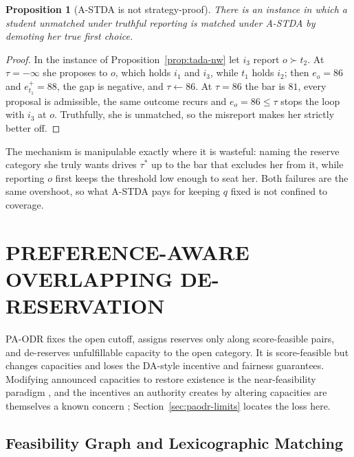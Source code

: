 \documentclass[a4paper,twoside]{article}
\newtheorem{proposition}{Proposition}
\theoremstyle{definition}
\begin{document}
\begin{proposition}[A-STDA is not strategy-proof]
\label{prop:tada-notsp}
There is an instance in which a student unmatched under truthful reporting is matched under A-STDA by demoting her true first choice.
\end{proposition}

\begin{proof}
In the instance of Proposition~\ref{prop:tada-nw} let $i_3$ report $o\succ t_2$. At $\tau=-\infty$ she proposes to $o$, which holds $i_1$ and $i_3$, while $t_1$ holds $i_2$; then $e_o=86$ and $e_{t_1}^+=88$, the gap is negative, and $\tau\gets86$. At $\tau=86$ the bar is $81$, every proposal is admissible, the same outcome recurs and $e_o=86\le\tau$ stops the loop with $i_3$ at $o$. Truthfully, she is unmatched, so the misreport makes her strictly better off.
\end{proof}

The mechanism is manipulable exactly where it is wasteful: naming the reserve category she truly wants drives $\tau^\ast$ up to the bar that excludes her from it, while reporting $o$ first keeps the threshold low enough to seat her. Both failures are the same overshoot, so what A-STDA pays for keeping $q$ fixed is not confined to coverage.

\section{\uppercase{Preference-Aware Overlapping De-Reservation}}
\label{sec:paodr}


PA-ODR fixes the open cutoff, assigns reserves only along score-feasible pairs, and de-reserves unfulfillable capacity to the open category. It is score-feasible but changes capacities and loses the DA-style incentive and fairness guarantees. Modifying announced capacities to restore existence is the near-feasibility paradigm \cite{NgVo18a}, and the incentives an authority creates by altering capacities are themselves a known concern \cite{Glit26a}; Section~\ref{sec:paodr-limits} locates the loss here.

\subsection{Feasibility Graph and Lexicographic Matching}
\end{document}
